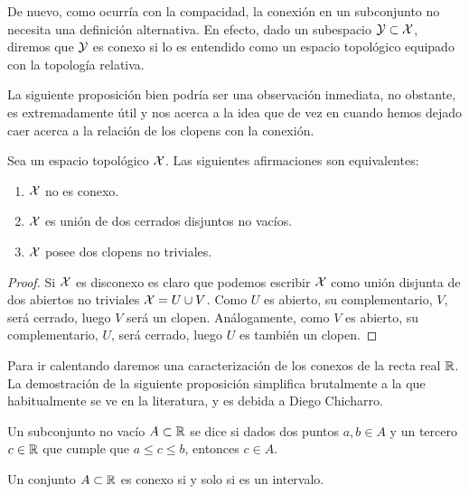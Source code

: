 \begin{obs}
	De nuevo, como ocurría con la compacidad, la conexión en un subconjunto no necesita una definición alternativa. En efecto, dado un subespacio $\mathcal{Y}\subset\mathcal{X}$, diremos que $\mathcal{Y}$ es conexo si lo es entendido como un espacio topológico equipado con la topología relativa.
\end{obs}
La siguiente proposición bien podría ser una observación inmediata, no obstante, es extremadamente útil y nos acerca a la idea que de vez en cuando hemos dejado caer acerca a la relación de los clopens con la conexión.
\begin{prop}
	Sea un espacio topológico $\mathcal{X}$. Las siguientes afirmaciones son equivalentes:
	\begin{enumerate}
		\item $\mathcal{X}$ no es conexo.
		\item $\mathcal{X}$ es unión de dos cerrados disjuntos no vacíos.
		\item $\mathcal{X}$ posee dos clopens no triviales.
	\end{enumerate}
\end{prop}
\begin{proof}
	Si $\mathcal{X}$ es disconexo es claro que podemos escribir $\mathcal{X}$ como unión disjunta de dos abiertos no triviales $\mathcal{X}=U\cup V$. Como $U$ es abierto, su complementario, $V$, será cerrado, luego $V$ será un clopen. Análogamente, como $V$ es abierto, su complementario, $U$, será cerrado, luego $U$ es también un clopen.
\end{proof}
Para ir calentando daremos una caracterización de los conexos de la recta real $\mathbb{R}$. La demostración de la siguiente proposición simplifica brutalmente a la que habitualmente se ve en la literatura, y es debida a Diego Chicharro.
\begin{defi}[Intervalo]
	Un subconjunto no vacío $A\subset\mathbb{R}$ se dice  si dados dos puntos $a,b\in A$ y un tercero $c\in\mathbb{R}$ que cumple que $a\leq c\leq b$, entonces $c\in A$. 
\end{defi}
\begin{prop}
	Un conjunto $A\subset \mathbb{R}$ es conexo si y solo si es un intervalo. 
\end{prop}
